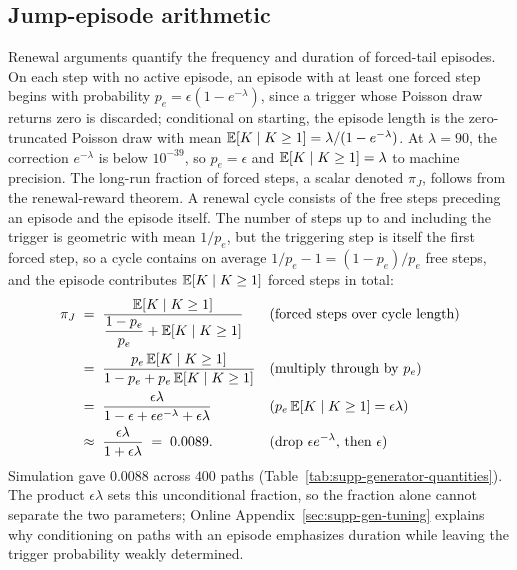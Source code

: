 \subsection{Jump-episode arithmetic}
\label{sec:supp-gen-renewal}

Renewal arguments quantify the frequency and duration of forced-tail episodes. On each step with no active episode, an episode with at
least one forced step begins with probability
$p_e = \epsilon (1 - e^{-\lambda})$, since a trigger whose Poisson
draw returns zero is discarded; conditional on starting, the episode
length is the zero-truncated Poisson draw with mean
$\mathbb{E}[K \mid K \ge 1] = \lambda / (1 - e^{-\lambda})$. At $\lambda =
90$, the correction $e^{-\lambda}$ is below $10^{-39}$, so $p_e =
\epsilon$ and $\mathbb{E}[K \mid K \ge 1] = \lambda$ to machine precision.
The long-run fraction of forced steps, a scalar denoted $\pi_J$,
follows from the renewal-reward theorem. A renewal cycle consists of
the free steps preceding an episode and the episode itself. The number
of steps up to and including the trigger is geometric with mean
$1/p_e$, but the triggering step is itself the first forced step, so
a cycle contains on average $1/p_e - 1 = (1 - p_e)/p_e$ free steps,
and the episode contributes $\mathbb{E}[K \mid K \ge 1]$ forced steps in
total:
\begin{align}
  \pi_J
   &\;=\; \frac{\mathbb{E}[K \mid K \ge 1]}
     {\dfrac{1 - p_e}{p_e} + \mathbb{E}[K \mid K \ge 1]}
     && \text{(forced steps over cycle length)} \notag \\
   &\;=\; \frac{p_e\, \mathbb{E}[K \mid K \ge 1]}
     {1 - p_e + p_e\, \mathbb{E}[K \mid K \ge 1]}
     && \text{(multiply through by $p_e$)} \notag \\
   &\;=\; \frac{\epsilon \lambda}
     {1 - \epsilon + \epsilon e^{-\lambda} + \epsilon \lambda}
     && \text{($p_e\, \mathbb{E}[K \mid K \ge 1] = \epsilon \lambda$)} \notag \\
   &\;\approx\; \frac{\epsilon \lambda}{1 + \epsilon \lambda}
     \;=\; 0.0089.
     && \text{(drop $\epsilon e^{-\lambda}$, then $\epsilon$)}
  \label{eq:supp-rho}
\end{align}
Simulation gave $0.0088$ across $400$ paths (Table~\ref{tab:supp-generator-quantities}). The product
$\epsilon \lambda$ sets this unconditional fraction, so the fraction
alone cannot separate the two parameters; Online Appendix~\ref{sec:supp-gen-tuning} explains why conditioning
on paths with an episode emphasizes duration while leaving the
trigger probability weakly determined.

